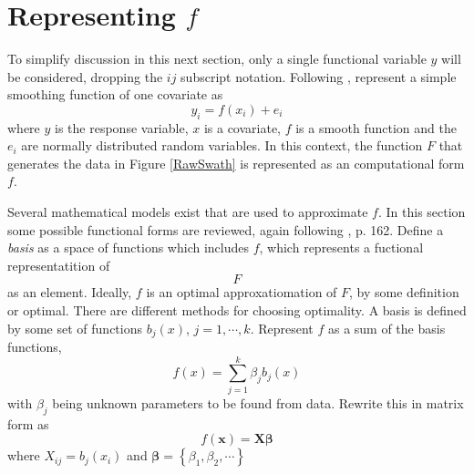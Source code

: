 \documentclass[phdcss]{SDSUThesis}
\begin{document}



\clearpage

\section{Representing $f$}

To simplify discussion in this next section, only a single functional variable $y$ will be considered, dropping the $ij$ subscript notation. Following \cite{wood-2017}, represent a simple smoothing function of one covariate as
\begin{equation}
y_i = f(x_i) + e_i
\end{equation}\label{SimpleFunctionalForm}
where $y$ is the response variable, $x$ is a covariate, $f$ is a smooth function and the $e_i$ are normally distributed random variables. In this context, the function $F$ that generates the data in Figure \ref{RawSwath} is represented as an computational form $f$.

Several mathematical models exist that are used to approximate $f$. In this section some possible functional forms are reviewed, again following \cite{wood-2017}, p. 162. Define a \textit{basis} as a space of functions which includes $f$, which represents a fuctional representatition of $$F$$ as an element. Ideally, $f$ is an optimal approxatiomation of $F$, by some definition or optimal. There are different methods for choosing optimality. A basis is defined by some set of functions $b_j(x)$, $j = 1, \cdots, k$. Represent $f$ as a sum of the basis functions,
\begin{equation}
f(x) = \sum_{j=1}^k \beta_j b_j(x)
\end{equation}\label{GenericBasisFunctions}
with $\beta_j$ being unknown parameters to be found from data. Rewrite this in matrix form as
\begin{equation}
f(\mathbf{x}) = \mathbf{X} \mathbf{\beta}
\end{equation}\label{BasisFunctionsMatrixForm}
where $X_{ij} = b_{j}(x_{i})$ and $\mathbf{\beta} = \left\{\beta_1, \beta_2, \cdots \right\}$
\end{document}
